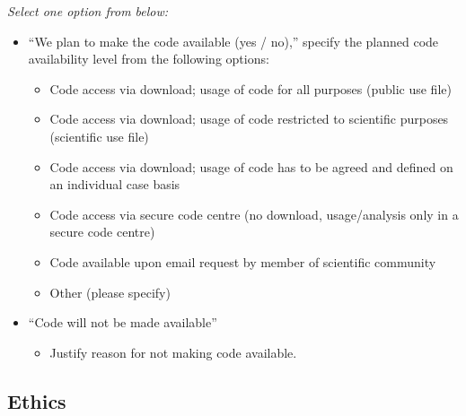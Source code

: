\documentclass[
]{article}
\providecommand{\tightlist}{%
  \setlength{\itemsep}{0pt}\setlength{\parskip}{0pt}}
\begin{document}
\begin{tcolorbox}[enhanced jigsaw, opacitybacktitle=0.6, bottomrule=.15mm, leftrule=.75mm, rightrule=.15mm, colbacktitle=quarto-callout-caution-color!10!white, toprule=.15mm, titlerule=0mm, left=2mm, colframe=quarto-callout-caution-color-frame, breakable, title=\textcolor{quarto-callout-caution-color}{\faFire}\hspace{0.5em}{Preregistration Item}, opacityback=0, coltitle=black, bottomtitle=1mm, colback=white, toptitle=1mm, arc=.35mm]

\emph{Select one option from below:}

\begin{itemize}
\tightlist
\item[$\square$]
  ``We plan to make the code available (yes / no),'' specify the planned
  code availability level from the following options:

  \begin{itemize}
  \tightlist
  \item
    Code access via download; usage of code for all purposes (public use
    file)
  \item
    Code access via download; usage of code restricted to scientific
    purposes (scientific use file)
  \item
    Code access via download; usage of code has to be agreed and defined
    on an individual case basis
  \item
    Code access via secure code centre (no download, usage/analysis only
    in a secure code centre)
  \item
    Code available upon email request by member of scientific community
  \item
    Other (please specify)
  \end{itemize}
\item[$\square$]
  ``Code will not be made available''

  \begin{itemize}
  \tightlist
  \item[$\square$]
    Justify reason for not making code available.
  \end{itemize}
\end{itemize}

\end{tcolorbox}

\subsection*{Ethics}\label{ethics}
\end{document}
